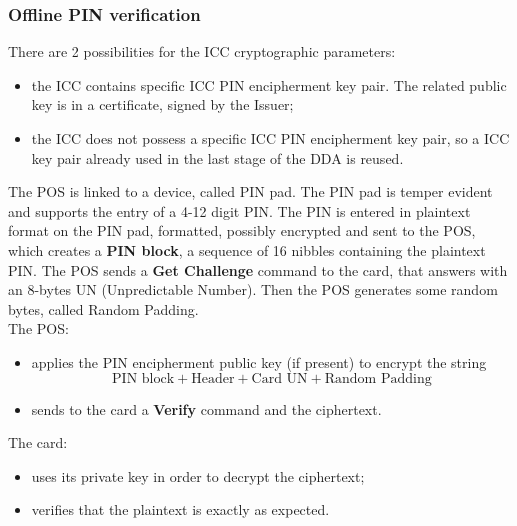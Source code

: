 \documentclass[a4paper, 10pt, titlepage]{article}
\begin{document}
\subsubsection*{Offline PIN verification}
There are 2 possibilities for the ICC cryptographic parameters:
\begin{itemize}
\item the ICC contains specific ICC PIN encipherment key pair. The related public key is in a certificate, signed by the Issuer;
\item the ICC does not possess a specific ICC PIN encipherment key pair, so a ICC key pair already used in the last stage of the DDA is reused.
\end{itemize}
The POS is linked to a device, called PIN pad. The PIN pad is temper evident and supports the entry of a 4-12 digit PIN. The PIN is entered in plaintext format on the PIN pad, formatted, possibly encrypted and sent to the POS, which creates a \textbf{PIN block}, a sequence of 16 nibbles containing the plaintext PIN.
The POS sends a \textbf{Get Challenge} command to the card, that answers with an 8-bytes UN (Unpredictable Number). Then the POS generates some random bytes, called Random Padding. \\
The POS:
\begin{itemize}
\item applies the PIN encipherment public key (if present) to encrypt the string
$$\text{PIN block} + \text{Header} + \text{Card UN} + \text{Random Padding}$$
\item sends to the card a \textbf{Verify} command and the ciphertext.
\end{itemize}
The card:
\begin{itemize}
\item uses its private key in order to decrypt the ciphertext;
\item verifies that the plaintext is exactly as expected.
\end{itemize}
\end{document}
